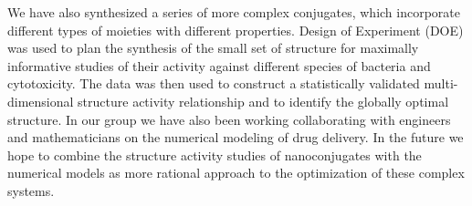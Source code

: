 \documentclass{article}
\begin{document}
{We have also synthesized a series of more complex conjugates, which incorporate different types of
moieties with different properties. Design of Experiment (DOE) was used to plan the synthesis of the
small set of structure for maximally informative studies of their activity against different species of
bacteria and cytotoxicity. The data was then used to construct a statistically validated multi-
dimensional structure activity relationship and to identify the globally optimal structure.
In our group we have also been working collaborating with engineers and mathematicians on the
numerical modeling of drug delivery. In the future we hope to combine the structure activity studies
of nanoconjugates with the numerical models as more rational approach to the optimization of these
complex systems.}
\end{document}
